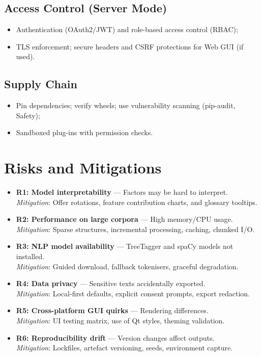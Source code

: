 \subsection{Access Control (Server Mode)}
\begin{itemize}
    \item Authentication (OAuth2/JWT) and role-based access control (RBAC);
    \item TLS enforcement; secure headers and CSRF protections for Web GUI (if used).
\end{itemize}

\subsection{Supply Chain}
\begin{itemize}
    \item Pin dependencies; verify wheels; use vulnerability scanning (pip-audit, Safety);
    \item Sandboxed plug-ins with permission checks.
\end{itemize}

\section{Risks and Mitigations}
\begin{itemize}
    \item \textbf{R1: Model interpretability} — Factors may be hard to interpret. \\
          \emph{Mitigation}: Offer rotations, feature contribution charts, and glossary tooltips.
    \item \textbf{R2: Performance on large corpora} — High memory/CPU usage. \\
          \emph{Mitigation}: Sparse structures, incremental processing, caching, chunked I/O.
    \item \textbf{R3: NLP model availability} — TreeTagger and spaCy models not installed. \\
          \emph{Mitigation}: Guided download, fallback tokenisers, graceful degradation.
    \item \textbf{R4: Data privacy} — Sensitive texts accidentally exported. \\
          \emph{Mitigation}: Local-first defaults, explicit consent prompts, export redaction.
    \item \textbf{R5: Cross-platform GUI quirks} — Rendering differences. \\
          \emph{Mitigation}: UI testing matrix, use of Qt styles, theming validation.
    \item \textbf{R6: Reproducibility drift} — Version changes affect outputs. \\
          \emph{Mitigation}: Lockfiles, artefact versioning, seeds, environment capture.
\end{itemize}

